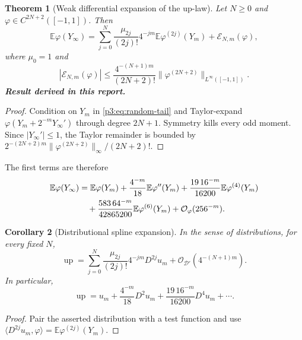 \documentclass[11pt,oneside]{article}
\numberwithin{equation}{section}
\newtheorem{theorem}{Theorem}[section]
\newtheorem{corollary}[theorem]{Corollary}
\theoremstyle{definition}
\theoremstyle{remark}
\newcommand{\E}{\mathbb E}
\newcommand{\Up}{\operatorname{up}}
\newcommand{\bigO}{\mathcal O}
\newcommand{\newresult}{\textbf{Result derived in this report.}}
\begin{document}
\begin{theorem}[Weak differential expansion of the up-law]
\label{p3:thm:weak-expansion}
Let $N\ge0$ and $\varphi\in C^{2N+2}([-1,1])$.  Then
\begin{equation}
 \boxed{
 \E\varphi(Y_\infty)
 =\sum_{j=0}^{N}\frac{\mu_{2j}}{(2j)!}4^{-jm}
   \E\varphi^{(2j)}(Y_m)+\mathcal E_{N,m}(\varphi),}
 \label{p3:eq:weak-expansion}
\end{equation}
where $\mu_0=1$ and
\begin{equation}
 \boxed{
 |\mathcal E_{N,m}(\varphi)|
 \le\frac{4^{-(N+1)m}}{(2N+2)!}
 \|\varphi^{(2N+2)}\|_{L^\infty([-1,1])}.}
 \label{p3:eq:weak-bound}
\end{equation}
\newresult
\end{theorem}

\begin{proof}
Condition on $Y_m$ in \eqref{p3:eq:random-tail} and Taylor-expand
$\varphi(Y_m+2^{-m}Y_\infty')$ through degree $2N+1$.  Symmetry kills every odd moment.
Since $|Y_\infty'|\le1$, the Taylor remainder is bounded by
$2^{-(2N+2)m}\|\varphi^{(2N+2)}\|_\infty/(2N+2)!$.
\end{proof}

The first terms are therefore
\begin{align}
 \E\varphi(Y_\infty)
 &=\E\varphi(Y_m)
 +\frac{4^{-m}}{18}\E\varphi''(Y_m)
 +\frac{19\,16^{-m}}{16200}\E\varphi^{(4)}(Y_m)
 \notag\\
 &\quad
 +\frac{583\,64^{-m}}{42865200}\E\varphi^{(6)}(Y_m)
 +\bigO_\varphi(256^{-m}).
 \label{p3:eq:weak-first}
\end{align}

\begin{corollary}[Distributional spline expansion]
\label{p3:cor:distributional}
In the sense of distributions, for every fixed $N$,
\begin{equation}
 \Up
 =\sum_{j=0}^{N}\frac{\mu_{2j}}{(2j)!}4^{-jm}D^{2j}u_m
 +\bigO_{\mathcal D'}(4^{-(N+1)m}).
 \label{p3:eq:distributional}
\end{equation}
In particular,
\begin{equation}
 \Up=u_m+\frac{4^{-m}}{18}D^2u_m
 +\frac{19\,16^{-m}}{16200}D^4u_m+\cdots.
 \label{p3:eq:distributional-first}
\end{equation}
\end{corollary}

\begin{proof}
Pair the asserted distribution with a test function and use
$\langle D^{2j}u_m,\varphi\rangle=\E\varphi^{(2j)}(Y_m)$.
\end{proof}
\end{document}
